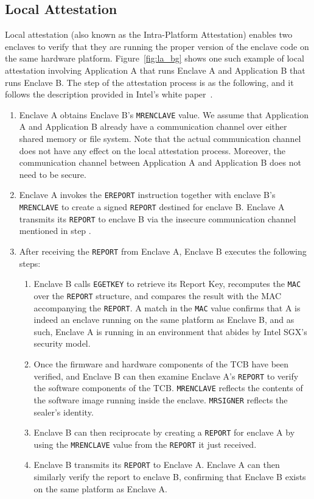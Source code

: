 \subsection{Local Attestation}
\label{ch:background:SGX:local}

Local attestation (also known as the Intra-Platform Attestation) enables two enclaves to verify that they are running the proper version of the enclave code on the same hardware platform. Figure~\ref{fig:la_bg} shows one such example of local attestation involving Application A that runs Enclave A and Application B that runs Enclave B. The step of the attestation process is as the following, and it follows the description provided in Intel's white paper~\cite{attestation_primitive_all}.

\begin{enumerate}
  \item [\one] Enclave A obtains Enclave B's \texttt{MRENCLAVE} value. We assume that Application A and Application B already have a communication channel over either shared memory or file system. Note that the actual communication channel does not have any effect on the local attestation process. Moreover, the communication channel between Application A and Application B does not need to be secure.
  \item [\two] Enclave A invokes the \texttt{EREPORT} instruction together with enclave B's \texttt{MRENCLAVE} to create a signed \texttt{REPORT} destined for enclave B. Enclave A transmits its \texttt{REPORT} to enclave B via the insecure communication channel mentioned in step \one.
  \item [\three] After receiving the \texttt{REPORT} from Enclave A, Enclave B executes the following steps:
  
   \begin{enumerate}
     \item  Enclave B calls \texttt{EGETKEY} to retrieve its Report Key, recomputes the \texttt{MAC} over the \texttt{REPORT} structure, and compares the result with the MAC accompanying the \texttt{REPORT}. A match in the \texttt{MAC} value confirms that A is indeed an enclave running on the same platform as Enclave B, and as such, Enclave A is running in an environment that abides by Intel SGX's security model.
     \item Once the firmware and hardware components of the TCB have been verified, and Enclave B can then examine Enclave A's \texttt{REPORT} to verify the software components of the TCB. \texttt{MRENCLAVE} reflects the contents of the software image running inside the enclave. \texttt{MRSIGNER} reflects the sealer's identity.
     \item Enclave B can then reciprocate by creating a \texttt{REPORT} for enclave A by using the \texttt{MRENCLAVE} value from the \texttt{REPORT} it just received.
     \item Enclave B transmits its \texttt{REPORT} to Enclave A. Enclave A can then similarly verify the report to enclave B, confirming that Enclave B exists on the same platform as Enclave A.
   \end{enumerate}
   
\end{enumerate}

